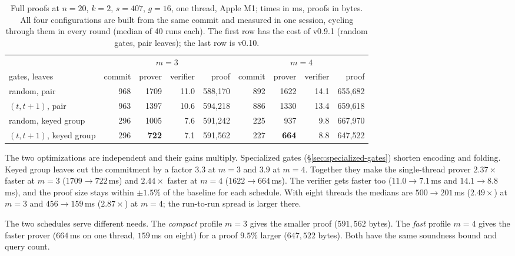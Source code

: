 \begin{table}[h]
\centering
\begin{tabular}{lrrrrrrrr}
\toprule
& \multicolumn{4}{c}{$m=3$} & \multicolumn{4}{c}{$m=4$}\\
\cmidrule(lr){2-5}\cmidrule(lr){6-9}
gates, leaves & commit & prover & verifier & proof & commit & prover & verifier & proof\\
\midrule
random, pair & 968 & 1709 & 11.0 & 588{,}170 & 892 & 1622 & 14.1 & 655{,}682\\
$(t,t+1)$, pair & 963 & 1397 & 10.6 & 594{,}218 & 886 & 1330 & 13.4 & 659{,}618\\
random, keyed group & 296 & 1005 & 7.6 & 591{,}242 & 225 & 937 & 9.8 & 667{,}970\\
$(t,t+1)$, keyed group & 296 & \textbf{722} & 7.1 & 591{,}562 & 227 & \textbf{664} & 8.8 & 647{,}522\\
\bottomrule
\end{tabular}
\caption{Full proofs at $n=20$, $k=2$, $s=407$, $g=16$, one thread, Apple M1; times in ms, proofs
in bytes. All four configurations are built from the same commit and measured in one session,
cycling through them in every round (median of 40 runs each). The first row has the cost of v0.9.1
(random gates, pair leaves); the last row is v0.10.}
\label{tab:block-leaves-e2e}
\end{table}

The two optimizations are independent and their gains multiply. Specialized gates
(\S\ref{sec:specialized-gates}) shorten encoding and folding. Keyed group leaves cut the commitment
by a factor $3.3$ at $m=3$ and $3.9$ at $m=4$. Together they make the single-thread prover
$2.37\times$ faster at $m=3$ ($1709\to722$\,ms) and $2.44\times$ faster at $m=4$ ($1622\to664$\,ms).
The verifier gets faster too ($11.0\to7.1$\,ms and $14.1\to8.8$\,ms), and the proof size stays within
$\pm1.5\%$ of the baseline for each schedule. With eight threads the medians are $500\to201$\,ms
($2.49\times$) at $m=3$ and $456\to159$\,ms ($2.87\times$) at $m=4$; the run-to-run spread is larger
there.

The two schedules serve different needs. The \emph{compact} profile $m=3$ gives the smaller proof
($591{,}562$ bytes). The \emph{fast} profile $m=4$ gives the faster prover ($664$\,ms on one thread,
$159$\,ms on eight) for a proof $9.5\%$ larger ($647{,}522$ bytes). Both have the same soundness bound and query count.
